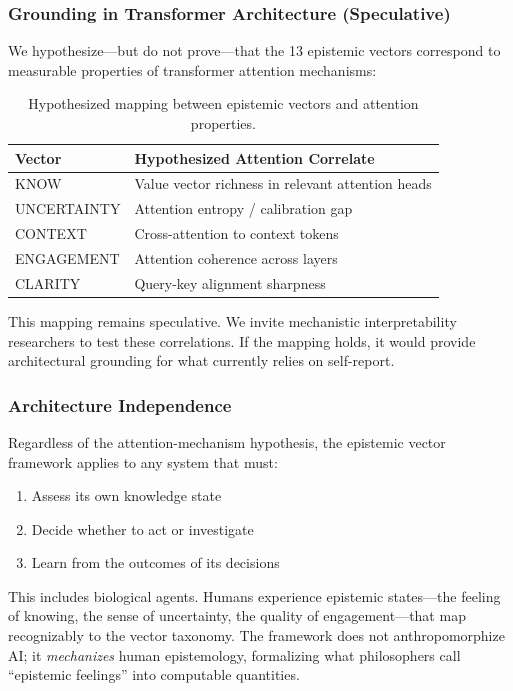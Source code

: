 \subsubsection{Grounding in Transformer Architecture (Speculative)}

We hypothesize---but do not prove---that the 13 epistemic vectors correspond to measurable properties of transformer attention mechanisms:

\begin{table}[h]
\centering
\begin{tabular}{ll}
\toprule
\textbf{Vector} & \textbf{Hypothesized Attention Correlate} \\
\midrule
KNOW & Value vector richness in relevant attention heads \\
UNCERTAINTY & Attention entropy / calibration gap \\
CONTEXT & Cross-attention to context tokens \\
ENGAGEMENT & Attention coherence across layers \\
CLARITY & Query-key alignment sharpness \\
\bottomrule
\end{tabular}
\caption{Hypothesized mapping between epistemic vectors and attention properties.}
\label{tab:attention-mapping}
\end{table}

This mapping remains speculative. We invite mechanistic interpretability researchers to test these correlations. If the mapping holds, it would provide architectural grounding for what currently relies on self-report.

\subsubsection{Architecture Independence}

Regardless of the attention-mechanism hypothesis, the epistemic vector framework applies to any system that must:

\begin{enumerate}
    \item Assess its own knowledge state
    \item Decide whether to act or investigate
    \item Learn from the outcomes of its decisions
\end{enumerate}

This includes biological agents. Humans experience epistemic states---the feeling of knowing, the sense of uncertainty, the quality of engagement---that map recognizably to the vector taxonomy. The framework does not anthropomorphize AI; it \emph{mechanizes} human epistemology, formalizing what philosophers call ``epistemic feelings'' into computable quantities.

